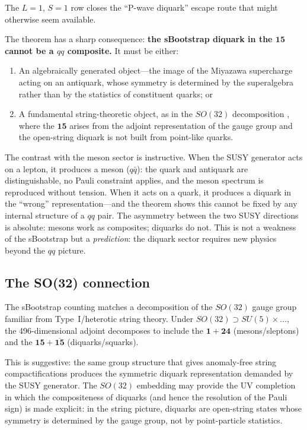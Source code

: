 \documentclass[12pt,a4paper]{article}
\begin{document}
The $L=1$, $S=1$ row closes the ``P-wave diquark'' escape route 
that might otherwise seem available.

The theorem has a sharp consequence: \textbf{the sBootstrap 
diquark in the $\mathbf{15}$ cannot be a $qq$ composite.} It 
must be either:
\begin{enumerate}
\item An algebraically generated object---the image of the 
Miyazawa supercharge \cite{Miyazawa, CattoGursey} acting on 
an antiquark, whose symmetry is determined by the superalgebra 
rather than by the statistics of constituent quarks; or
\item A fundamental string-theoretic object, as in the $SO(32)$ 
decomposition \cite{Rivero2005}, where the $\mathbf{15}$ 
arises from the adjoint representation of the gauge group and 
the open-string diquark is not built from point-like quarks.
\end{enumerate}

The contrast with the meson sector is instructive. When the 
SUSY generator acts on a lepton, it produces a meson 
($q\bar{q}$): the quark and antiquark are distinguishable, 
no Pauli constraint applies, and the meson spectrum is 
reproduced without tension. When it acts on a quark, it 
produces a diquark in the ``wrong'' representation---and the 
theorem shows this cannot be fixed by any internal structure 
of a $qq$ pair. The asymmetry between the two SUSY directions 
is absolute: mesons work as composites; diquarks do not. 
This is not a weakness of the sBootstrap but a 
\emph{prediction}: the diquark sector requires new physics 
beyond the $qq$ picture.

\subsection{The SO(32) connection}

The sBootstrap counting matches a decomposition of the $SO(32)$ gauge 
group familiar from Type~I/heterotic string theory. Under 
$SO(32) \supset SU(5) \times \ldots$, the 496-dimensional adjoint 
decomposes to include the 
$\mathbf{1} + \mathbf{24}$ (mesons/sleptons) and the 
$\mathbf{15} + \overline{\mathbf{15}}$ (diquarks/squarks).

This is suggestive: the same group structure that gives anomaly-free 
string compactifications produces the symmetric diquark 
representation demanded by the SUSY generator. The $SO(32)$ embedding 
may provide the UV completion in which the compositeness of diquarks 
(and hence the resolution of the Pauli sign) is made explicit: in 
the string picture, diquarks are open-string states whose symmetry 
is determined by the gauge group, not by point-particle statistics.
\end{document}
